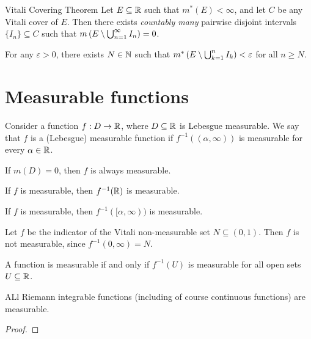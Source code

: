 \begin{thm}{Vitali Covering Theorem}\label{thm:vitali-covering}\proofbreak
    Let $E \subseteq \mathbb{R}$ such that $m^{*}(E) < \infty$, and let $C$ be any Vitali cover of $E$. Then there exists \emph{countably many} pairwise disjoint intervals $\{I_n\} \subseteq C$ such that $m\left(E\setminus \bigcup_{n=1}^{\infty}I_n\right) = 0$.
\end{thm}

\begin{cor}
    For any $\varepsilon > 0$, there exists $N \in \mathbb{N}$ such that $m^{*}\left(E\setminus \bigcup_{k=1}^{n}I_k\right) < \varepsilon$ for all $n \geq N$.
\end{cor}

\section{Measurable functions}

\begin{defn}
    Consider a function $f: D \to \mathbb{R}$, where $D \subseteq \mathbb{R}$ is Lebesgue measurable. We say that $f$ is a (Lebesgue) measurable function if $f^{-1}((\alpha, \infty))$ is measurable for every $\alpha \in \mathbb{R}$.
\end{defn}

\begin{exmp}
    If $m(D) = 0$, then $f$ is always measurable.

    If $f$ is measurable, then $f^{-1}(\mathbb{R})$ is measurable.

    If $f$ is measurable, then $f^{-1}([\alpha, \infty))$ is measurable.
\end{exmp}

\begin{exmp}
    Let $f$ be the indicator of the Vitali non-measurable set $N \subseteq (0, 1)$. Then $f$ is not measurable, since $f^{-1}(0, \infty) = N$.
\end{exmp}

\begin{thm}
    A function is measurable if and only if $f^{-1}(U)$ is measurable for all open sets $U \subseteq \mathbb{R}$.
\end{thm}

\begin{prop}
    ALl Riemann integrable functions (including of course continuous functions) are measurable.
\end{prop}

\begin{proof}
    
\end{proof}
